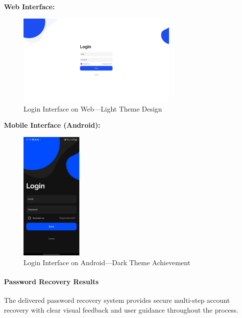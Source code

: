\textbf{Web Interface:}
\begin{figure}[!htbp]
    \centering
    \includegraphics[width=0.7\textwidth]{figures/ui/login_web.png}
    \caption{Login Interface on Web---Light Theme Design}\label{fig:web_login}
\end{figure}

\textbf{Mobile Interface (Android):}
\begin{figure}[!htbp]
    \centering
    \includegraphics[width=0.27\textwidth]{figures/ui/login_android.jpeg}
    \caption{Login Interface on Android---Dark Theme Achievement}\label{fig:android_login}
\end{figure}

\paragraph{Password Recovery Results}
The delivered password recovery system provides secure multi-step account recovery with clear visual feedback and user guidance throughout the process.

